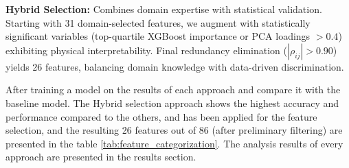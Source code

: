 \documentclass[12pt]{article}
\begin{document}
\textbf{Hybrid Selection:} Combines domain expertise with statistical validation. Starting with 31 domain-selected features, we augment with statistically significant variables (top-quartile XGBoost importance or PCA loadings $>0.4$) exhibiting physical interpretability. Final redundancy elimination ($|\rho_{ij}| > 0.90$) yields 26 features, balancing domain knowledge with data-driven discrimination.

After training a model on the results of each approach and compare it with the baseline model. The Hybrid selection approach shows the highest accuracy and performance compared to the others, and has been applied for the feature selection, and the resulting 26 features out of 86 (after preliminary filtering) are presented in the table \ref{tab:feature_categorization}. The analysis results of every approach are presented in the results section.
\end{document}
